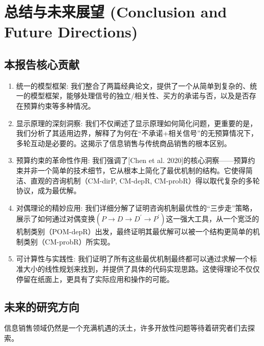 \section{总结与未来展望 (Conclusion and Future Directions)}

\subsection{本报告核心贡献}

\begin{enumerate}
    \item 统一的模型框架: 我们整合了两篇经典论文，提供了一个从简单到复杂的、统一的模型框架，能够处理信号的独立/相关性、买方的承诺与否，以及是否存在预算约束等多种情况。
    \item 显示原理的深刻洞察: 我们不仅阐述了显示原理如何简化问题，更重要的是，我们分析了其适用边界，解释了为何在“不承诺+相关信号”的无预算情况下，多轮互动是必要的。这揭示了信息销售与传统商品销售的根本区别。
    \item 预算约束的革命性作用: 我们强调了[Chen et al. 2020]的核心洞察——预算约束并非一个简单的技术细节，它从根本上简化了最优机制的结构。它使得简洁、直观的咨询机制（CM-dirP, CM-depR, CM-probR）得以取代复杂的多轮协议，成为最优解。
    \item 对偶理论的精妙应用: 我们详细分解了证明咨询机制最优性的“三步走”策略，展示了如何通过对偶变换$(P\to D\to D^\prime \to P^\prime)$这一强大工具，从一个宽泛的机制类别（POM-depR）出发，最终证明其最优解可以被一个结构更简单的机制类别（CM-probR）所实现。
    \item 可计算性与实践性: 我们证明了所有这些最优机制最终都可以通过求解一个标准大小的线性规划来找到，并提供了具体的代码实现思路。这使得理论不仅仅停留在纸面上，更具有了实际应用和操作的可能。
\end{enumerate}

\subsection{未来的研究方向}

信息销售领域仍然是一个充满机遇的沃土，许多开放性问题等待着研究者们去探索。

